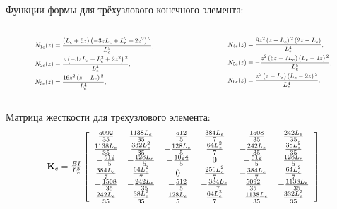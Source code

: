 \documentclass[7pt]{beamer}
\numberwithin{equation}{section}
\newcommand*{\Scale}[2][4]{\scalebox{#1}{$#2$}}
\begin{document}
\begin{frame}
	\begin{block}{Функции формы для трёхузлового конечного элемента:}
			\begin{columns}
				\begin{column}{0.5\textwidth}
					\[
						\Scale[0.65]{
							\begin{split}
								N_{1e}(z)&=\frac{\left(L_e+6 z\right) \left(-3 z L_e+L_e^2+2 z^2\right){}^2}{L_e^5}, \\
								N_{2e}(z)&=\frac{z \left(-3 z L_e+L_e^2+2 z^2\right){}^2}{L_e^4}, \\
								N_{3e}(z)&=\frac{16 z^2 \left(z-L_e\right){}^2}{L_e^4},\\							
							\end{split}
						}
					\]
				\end{column}
				\begin{column}{0.5\textwidth}
					\[
						\Scale[0.65]{
							\begin{split}
								N_{4e}(z)&=\frac{8 z^2 \left(z-L_e\right){}^2 \left(2 z-L_e\right)}{L_e^4}, \\
								N_{5e}(z)&=-\frac{z^2 \left(6 z-7 L_e\right) \left(L_e-2 z\right){}^2}{L_e^5}, \\
								N_{6e}(z)&=\frac{z^2 \left(z-L_e\right) \left(L_e-2 z\right){}^2}{L_e^4}.
							\end{split}
						}
					\]
				\end{column}
			\end{columns}
	\end{block}
	\begin{block}{Матрица жесткости для трехузлового элемента:}
		\begin{equation*}
			\Scale[0.9] {
				\textbf{K}_e=\frac{EI}{L_e^{3}}
				\left[
				\begin{array}{cccccc}
					\frac{5092}{35} & \frac{1138 L_e}{35} & -\frac{512}{5} & \frac{384 L_e}{7} & -\frac{1508}{35}& \frac{242 L_{e}}{35}\\
						\frac{1138 L_{e}}{35} & \frac{332 L_e^{2}}{35} & -\frac{128 L_e}{5} & \frac{64 L_e^{2}}{7} & -\frac{242 L_{e}}{35}& \frac{38 L_{e}^{2}}{35}\\
					-\frac{512}{5} & -\frac{128 L_e}{5} & -\frac{1024}{5} & 0 & -\frac{512}{5}& \frac{128  L_{e}}{5}\\
						\frac{384 L_{e}}{7} & \frac{64 L_e^{2}}{7} & 0 & \frac{256 L_e^{2}}{7} & -\frac{384 L_{e}}{7}& \frac{64 L_{e}^{2}}{7}\\
					-\frac{1508}{35} & -\frac{242 L_e}{35} & -\frac{512}{5} & -\frac{384 L_{e}}{7} & \frac{5092}{35} &  -\frac{1138  L_{e}}{35}\\
						\frac{242 L_{e}}{35} & \frac{38 L_e^{2}}{35} &  \frac{128 L_e}{5} & \frac{64 L_e^{2}}{7} & -\frac{1138 L_{e}}{35}& \frac{332 L_{e}^{2}}{35}\\
				\end{array}
				\right]
			}
		\end{equation*}
	\end{block}
\end{frame}
\end{document}
